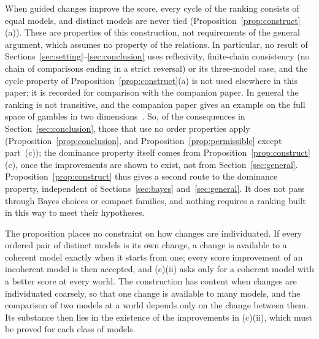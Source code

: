 \documentclass[11pt]{article}
\theoremstyle{definition}
\theoremstyle{remark}
\begin{document}
When guided changes improve the score, every cycle of the ranking consists of equal models, and distinct models are never tied (Proposition~\ref{prop:construct}(a)). These are properties of this construction, not requirements of the general argument, which assumes no property of the relations. In particular, no result of Sections~\ref{sec:setting}--\ref{sec:conclusion} uses reflexivity, finite-chain consistency (no chain of comparisons ending in a strict reversal) or its three-model case, and the cycle property of Proposition~\ref{prop:construct}(a) is not used elsewhere in this paper; it is recorded for comparison with the companion paper. In general the ranking is not transitive, and the companion paper gives an example on the full space of gambles in two dimensions~\cite{KCM}. So, of the consequences in Section~\ref{sec:conclusion}, those that use no order properties apply (Proposition~\ref{prop:conclusion}, and Proposition~\ref{prop:permissible} except part~(c)); the dominance property itself comes from Proposition~\ref{prop:construct}(c), once the improvements are shown to exist, not from Section~\ref{sec:general}. Proposition~\ref{prop:construct} thus gives a second route to the dominance property, independent of Sections~\ref{sec:bayes} and~\ref{sec:general}. It does not pass through Bayes choices or compact families, and nothing requires a ranking built in this way to meet their hypotheses.

The proposition places no constraint on how changes are individuated. If every ordered pair of distinct models is its own change, a change is available to a coherent model exactly when it starts from one; every score improvement of an incoherent model is then accepted, and (c)(ii) asks only for a coherent model with a better score at every world. The construction has content when changes are individuated coarsely, so that one change is available to many models, and the comparison of two models at a world depends only on the change between them. Its substance then lies in the existence of the improvements in (c)(ii), which must be proved for each class of models.
\end{document}
